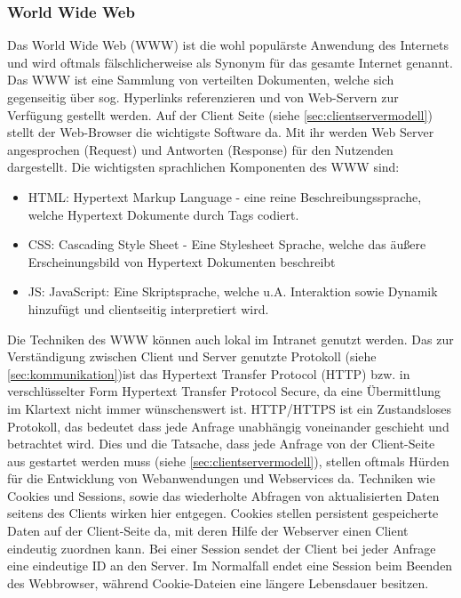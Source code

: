 \subsubsection{World Wide Web}\label{sec:www}
Das World Wide Web (WWW) ist die wohl populärste Anwendung des Internets \cite{Safran2011} und wird oftmals fälschlicherweise als Synonym für das gesamte Internet genannt. Das WWW ist eine Sammlung von verteilten Dokumenten, welche sich gegenseitig über sog. Hyperlinks referenzieren und von Web-Servern zur Verfügung gestellt werden. Auf der Client Seite (siehe \ref{sec:clientservermodell}) stellt der Web-Browser die wichtigste Software da. Mit ihr werden Web Server angesprochen (Request) und Antworten (Response) für den Nutzenden dargestellt. Die wichtigsten sprachlichen Komponenten des WWW sind: \\ 
\begin{itemize}
	\item HTML: Hypertext Markup Language - eine reine Beschreibungssprache, welche Hypertext Dokumente durch Tags codiert. 
	\item CSS: Cascading Style Sheet - Eine Stylesheet Sprache, welche das äußere Erscheinungsbild von Hypertext Dokumenten beschreibt
	\item JS: JavaScript: Eine Skriptsprache, welche u.A. Interaktion sowie Dynamik hinzufügt und clientseitig interpretiert wird. 
\end{itemize}
Die Techniken des WWW können auch lokal im Intranet genutzt werden. 
Das zur Verständigung zwischen Client und Server genutzte Protokoll (siehe \ref{sec:kommunikation})ist das Hypertext Transfer Protocol (HTTP) bzw. in verschlüsselter Form Hypertext Transfer Protocol Secure, da eine Übermittlung im Klartext nicht immer wünschenswert ist. HTTP/HTTPS ist ein Zustandsloses Protokoll, das bedeutet dass jede Anfrage unabhängig voneinander geschieht und betrachtet wird. Dies und die Tatsache, dass jede Anfrage von der Client-Seite aus gestartet werden muss (siehe \ref{sec:clientservermodell}), stellen oftmals Hürden für die Entwicklung von Webanwendungen und Webservices da. Techniken wie Cookies und Sessions, sowie das wiederholte Abfragen von aktualisierten Daten seitens des Clients wirken hier entgegen. Cookies stellen persistent gespeicherte Daten auf der Client-Seite da, mit deren Hilfe der Webserver einen Client eindeutig zuordnen kann. Bei einer Session sendet der Client bei jeder Anfrage eine eindeutige ID an den Server. Im Normalfall endet eine Session beim Beenden des Webbrowser, während Cookie-Dateien eine längere Lebensdauer besitzen.      
%
